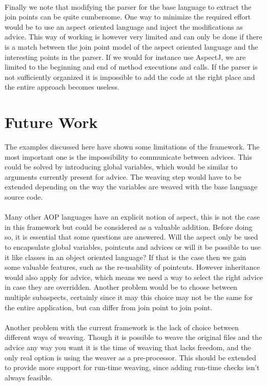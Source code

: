 \documentclass[a4paper]{report}
\begin{document}
\\
Finally we note that modifying the parser for the base language to extract the join points can be quite cumbersome. One way to minimize the required effort would be to use an aspect oriented language and inject the modifications as advice. This way of working is however very limited and can only be done if there is a match between the join point model of the aspect oriented language and the interesting points in the parser. If we would for instance use AspectJ, we are limited to the beginning and end of method executions and calls. If the parser is not sufficiently organized it is impossible to add the code at the right place and the entire approach becomes useless.

\chapter{Future Work}
The examples discussed here have shown some limitations of the framework. The most important one is the impossibility to communicate between advices. This could be solved by introducing global variables, which would be similar to arguments currently present for advice. The weaving step would have to be extended depending on the way the variables are weaved with the base language source code.\\
\\
Many other AOP languages have an explicit notion of aspect, this is not the case in this framework but could be considered as a valuable addition. Before doing so, it is essential that some questions are answered. Will the aspect only be used to encapsulate global variables, pointcuts and advices or will it be possible to use it like classes in an object oriented language? If that is the case then we gain some valuable features, such as the re-usability of pointcuts. However inheritance would also apply for advice, which means we need a way to select the right advice in case they are overridden. Another problem would be to choose between multiple subaspects, certainly since it may this choice may not be the same for the entire application, but can differ from join point to join point.\\
\\
Another problem with the current framework is the lack of choice between different ways of weaving. Though it is possible to weave the original files and the advice any way you want it is the time of weaving that lacks freedom, and the only real option is using the weaver as a pre-processor. This should be extended to provide more support for run-time weaving, since adding run-time checks isn't always feasible.\\
\end{document}
